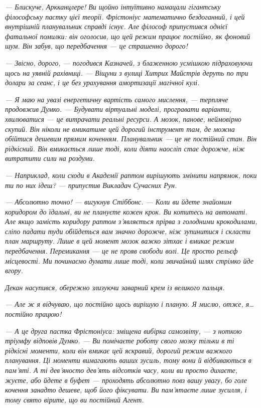 \documentclass[12pt, a4paper, openany]{book}
\begin{document}
\begin{terrybox}
\textit{--- Блискуче, Аркканцлере! Ви щойно інтуїтивно намацали гігантську філософську пастку цієї теорії. Фрістоніус математично бездоганний, і цей внутрішній планувальник справді існує. Але філософ припустився однієї фатальної помилки: він оголосив, що цей режим працює постійно, як фоновий шум. Він забув, що передбачення --- це страшенно дорого!}

\textit{--- Звісно, дорого, --- погодився Казначей, з блаженною усмішкою підраховуючи щось на уявній рахівниці. --- Віщуни з вулиці Хитрих Майстрів деруть по три долари за сеанс, і це без урахування амортизації магічної кулі.}

\textit{--- Я маю на увазі енергетичну вартість самого мислення, --- терпляче продовжив Думко. --- Будувати віртуальні моделі, програвати варіанти, хвилюватися --- це витрачати реальні ресурси. А мозок, панове, неймовірно скупий. Він ніколи не вмикатиме цей дорогий інструмент там, де можна обійтися дешевим прямим коченням. Планувальник --- це не постійний стан. Він рідкісний. Він вмикається лише тоді, коли діяти наосліп стає дорожче, ніж витратити сили на роздуми.}

\textit{--- Наприклад, коли сходи в Академії раптом вирішують змінити напрямок, поки ти по них ідеш? --- припустив Викладач Сучасних Рун.}

\textit{--- Абсолютно точно! --- вигукнув Стіббонс. --- Коли ви йдете знайомим коридором до їдальні, ви не плануєте кожен крок. Ви котитесь на автоматі. Але якщо замість коридору раптом з'являється прірва з голодними крокодилами, сліпо падати туди обійдеться вам значно дорожче, ніж зупинитися і скласти план маршруту. Лише в цей момент мозок важко зітхає і вмикає режим передбачення. Перемикання --- це не прояв свободи волі. Це просто рельєф місцевості. Ми починаємо думати лише тоді, коли звичайний шлях стрімко йде вгору.}

\textit{Декан насупився, обережно злизуючи заварний крем із великого пальця.}

\textit{--- Але ж я відчуваю, що постійно щось вирішую і планую. Я мислю, отже, я\ldots{} постійно працюю!}

\textit{--- А це друга пастка Фрістоніуса: зміщена вибірка самозвіту, --- з ноткою тріумфу відповів Думко. --- Ви помічаєте роботу свого мозку тільки в ті рідкісні моменти, коли він вмикає цей яскравий, дорогий режим важкого планування. Ці моменти вимагають ваших зусиль, тому вони й відбиваються в пам'яті. А ті дев'яносто дев'ять відсотків часу, коли ви просто дихаєте, жуєте, або йдете в буфет --- проходять абсолютно повз вашу увагу, бо голе кочення занадто дешеве, щоб його фіксувати. Ви пам'ятаєте лише зусилля, і тому свято вірите, що ви постійний Агент.}


\end{terrybox}
\end{document}
